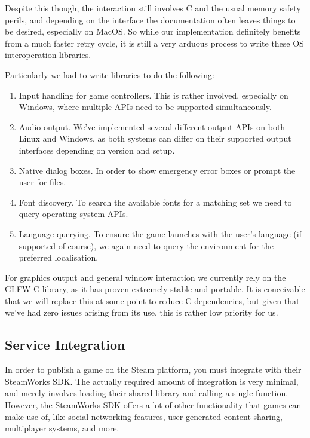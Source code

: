 \documentclass[format=sigconf]{acmart}
\begin{document}
Despite this though, the interaction still involves C and the usual memory safety perils, and depending on the interface the documentation often leaves things to be desired, especially on MacOS. So while our implementation definitely benefits from a much faster retry cycle, it is still a very arduous process to write these OS interoperation libraries.

Particularly we had to write libraries to do the following:
\begin{enumerate}
\item Input handling for game controllers. This is rather involved, especially on Windows, where multiple APIs need to be supported simultaneously.\cite{cl-gamepad}
\item Audio output. We've implemented several different output APIs on both Linux and Windows, as both systems can differ on their supported output interfaces depending on version and setup.\cite{libmixed}\cite{cl-mixed}\cite{harmony}
\item Native dialog boxes. In order to show emergency error boxes or prompt the user for files.\cite{messagebox}\cite{file-select}
\item Font discovery. To search the available fonts for a matching set we need to query operating system APIs.\cite{font-discovery}
\item Language querying. To ensure the game launches with the user's language (if supported of course), we again need to query the environment for the preferred localisation.\cite{system-locale}
\end{enumerate}

For graphics output and general window interaction we currently rely on the GLFW\cite{glfw} C library, as it has proven extremely stable and portable. It is conceivable that we will replace this at some point to reduce C dependencies, but given that we've had zero issues arising from its use, this is rather low priority for us.

\subsection{Service Integration}\label{steam}
In order to publish a game on the Steam platform, you must integrate with their SteamWorks SDK. The actually required amount of integration is very minimal, and merely involves loading their shared library and calling a single function. However, the SteamWorks SDK offers a lot of other functionality that games can make use of, like social networking features, user generated content sharing, multiplayer systems, and more.
\end{document}
